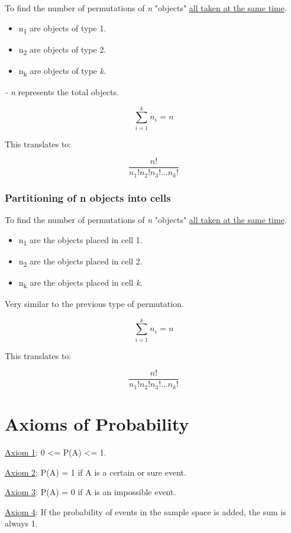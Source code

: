 \documentclass[11pt]{article}
\begin{document}
To find the number of permutations of \emph{n} "objects" \uline{all taken at the same time}.

\begin{itemize}
\item n\textsubscript{1} are objects of type 1.
\item n\textsubscript{2} are objects of type 2.
\item n\textsubscript{k} are objects of type \emph{k}.
\end{itemize}

\emph{- n} represents the total objects.


\[
\sum\limits_{i=1}^{k}^{} n_{i}_{} = n
\]

This translates to:

\[
\frac{n!}{n_{1}! n_{2}! n_{3}! ... n_{k}!}
\]
\subsubsection{Partitioning of n objects into cells}
\label{sec:org0e77a10}

To find the number of permutations of \emph{n} "objects" \uline{all taken at the same time}.

\begin{itemize}
\item n\textsubscript{1} are the objects placed in cell 1.
\item n\textsubscript{2} are the objects placed in cell 2.
\item n\textsubscript{k} are the objects placed in cell \emph{k}.
\end{itemize}

Very similar to the previous type of permutation.


\[
\sum\limits_{i=1}^{k}^{} n_{i}_{} = n
\]

This translates to:

\[
\frac{n!}{n_{1}! n_{2}! n_{3}! ... n_{k}!}
\]
\section{Axioms of Probability}
\label{sec:org6b2f50a}

\uline{Axiom 1}: 0 <= P(A) <= 1.

\uline{Axiom 2}: P(A) = 1 if A is a certain or sure event.

\uline{Axiom 3}: P(A) = 0 if A is an impossible event.

\uline{Axiom 4}: If the probability of events in the sample space is added, the sum is always 1.
\end{document}
